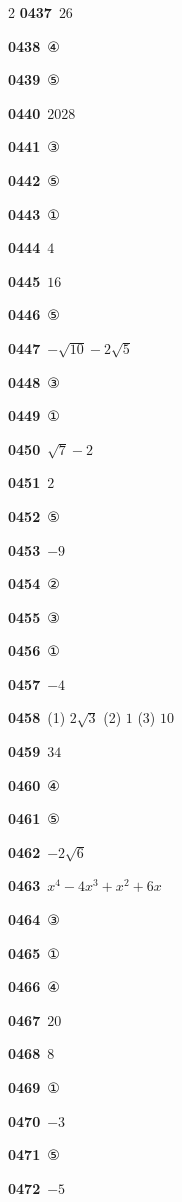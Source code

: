 \documentclass[10pt,a4paper]{article}
\begin{document}
\begin{multicols}{2}
\noindent\textbf{0437}\ $26$\par
\noindent\textbf{0438}\ ④\par
\noindent\textbf{0439}\ ⑤\par
\noindent\textbf{0440}\ $2028$\par
\noindent\textbf{0441}\ ③\par
\noindent\textbf{0442}\ ⑤\par
\noindent\textbf{0443}\ ①\par
\noindent\textbf{0444}\ $4$\par
\noindent\textbf{0445}\ $16$\par
\noindent\textbf{0446}\ ⑤\par
\noindent\textbf{0447}\ $-\sqrt{10}-2\sqrt{5}$\par
\noindent\textbf{0448}\ ③\par
\noindent\textbf{0449}\ ①\par
\noindent\textbf{0450}\ $\sqrt{7}-2$\par
\noindent\textbf{0451}\ $2$\par
\noindent\textbf{0452}\ ⑤\par
\noindent\textbf{0453}\ $-9$\par
\noindent\textbf{0454}\ ②\par
\noindent\textbf{0455}\ ③\par
\noindent\textbf{0456}\ ①\par
\noindent\textbf{0457}\ $-4$\par
\noindent\textbf{0458}\ (1) $2\sqrt{3}$ (2) $1$ (3) $10$\par
\noindent\textbf{0459}\ $34$\par
\noindent\textbf{0460}\ ④\par
\noindent\textbf{0461}\ ⑤\par
\noindent\textbf{0462}\ $-2\sqrt{6}$\par
\noindent\textbf{0463}\ $x^4-4x^3+x^2+6x$\par
\noindent\textbf{0464}\ ③\par
\noindent\textbf{0465}\ ①\par
\noindent\textbf{0466}\ ④\par
\noindent\textbf{0467}\ $20$\par
\noindent\textbf{0468}\ $8$\par
\noindent\textbf{0469}\ ①\par
\noindent\textbf{0470}\ $-3$\par
\noindent\textbf{0471}\ ⑤\par
\noindent\textbf{0472}\ $-5$\par

\end{multicols}
\end{document}
